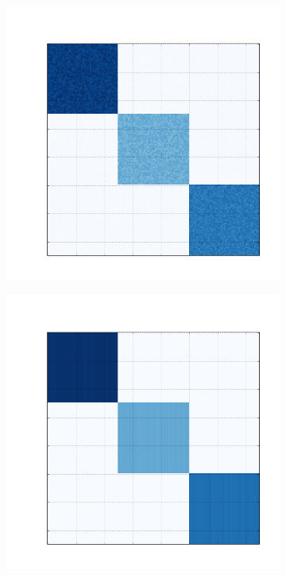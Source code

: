 \documentclass[10pt]{beamer}
\begin{document}
\begin{frame}
\begin{figure}[H]
      \begin{subfigure}[b]{0.13\textwidth}
          \includegraphics[width=\textwidth]{img/b-bic-structure.png}
      \end{subfigure}
      \begin{subfigure}[b]{0.13\textwidth}
          \includegraphics[width=\textwidth]{img/b-reconstruction-kmeans.png}

\end{subfigure}
\end{figure}
\end{frame}
\end{document}
